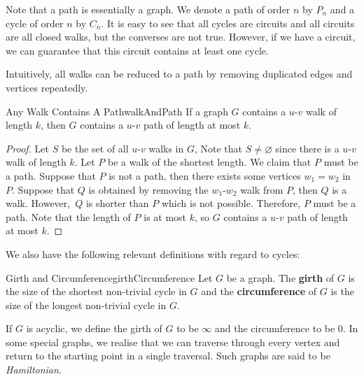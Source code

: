 \documentclass[math]{amznotes}
\theoremstyle{remark}
\newcommand{\0}{\mathbf{0}}
\newcommand{\1}{\mathbf{1}}
\begin{document}
Note that a path is essentially a graph. We denote a path of order $n$ by $P_n$ and a cycle of order $n$ by $C_n$. It is easy to see that all cycles are circuits and all circuits are all closed walks, but the converses are not true. However, if we have a circuit, we can guarantee that this circuit contains at least one cycle.

Intuitively, all walks can be reduced to a path by removing duplicated edges and vertices repeatedly.
\begin{probox}{Any Walk Contains A Path}{walkAndPath}
    If a graph $G$ contains a $u$-$v$ walk of length $k$, then $G$ contains a $u$-$v$ path of length at most $k$.
    \tcblower
    \begin{proof}
        Let $S$ be the set of all $u$-$v$ walks in $G$, Note that $S \neq \varnothing$ since there is a $u$-$v$ walk of length $k$. Let $P$ be a walk of the shortest length. We claim that $P$ must be a path. Suppose that $P$ is not a path, then there exists some vertices $w_1 = w_2$ in $P$. Suppose that $Q$ is obtained by removing the $w_1$-$w_2$ walk from $P$, then $Q$ is a walk. However,~$Q$ is shorter than $P$ which is not possible. Therefore, $P$ must be a path. Note that the length of $P$ is at most $k$, so $G$ contains a $u$-$v$ path of length at most $k$.
    \end{proof}
\end{probox}

We also have the following relevant definitions with regard to cycles:
\begin{dfnbox}{Girth and Circumference}{girthCircumference}
    Let $G$ be a graph. The {\color{red} \textbf{girth}} of $G$ is the size of the shortest non-trivial cycle in $G$ and the {\color{red} \textbf{circumference}} of $G$ is the size of the longest non-trivial cycle in $G$.
\end{dfnbox}
If $G$ is acyclic, we define the girth of $G$ to be $\infty$ and the circumference to be $0$. In some special graphs, we realise that we can traverse through every vertex and return to the starting point in a single traversal. Such graphs are said to be \textit{Hamiltonian}.
\end{document}
